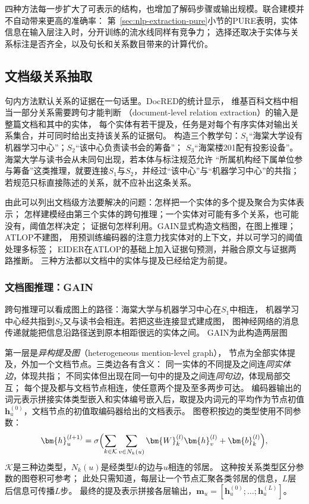 四种方法每一步扩大了可表示的结构，也增加了解码步骤或输出规模。联合建模并不自动带来更高的准确率：
第~\ref{sec:nlp-extraction-pure}小节的PURE表明，实体信息在输入层注入时，分开训练的流水线同样有竞争力；
选择还取决于实体与关系标注是否齐全，以及句长和关系数目带来的计算代价。

\subsection{文档级关系抽取}
\label{sec:nlp-extraction-docre}

句内方法默认关系的证据在一句话里。DocRED的统计显示，
维基百科文档中相当一部分关系需要跨句才能判断
（document-level relation extraction）的输入是整篇文档和其中的实体，
每个实体有若干提及，任务是对每个有序实体对输出关系集合，并可同时给出支持该关系的证据句。
构造三个教学句：$S_1$“海棠大学设有机器学习中心”；$S_2$“该中心负责读书会的筹备”；
$S_3$“海棠楼201配有投影设备”。海棠大学与读书会从未同句出现，若本体与标注规范允许
“所属机构经下属单位参与筹备”这类推理，就要连接$S_1$与$S_2$，并经过“该中心”与“机器学习中心”的共指；
若规范只标直接陈述的关系，就不应补出这条关系。

由此可以列出文档级方法要解决的问题：怎样把一个实体的多个提及聚合为实体表示；
怎样建模经由第三个实体的跨句推理；一个实体对可能有多个关系，也可能没有，阈值怎样决定；
证据句怎样利用。GAIN显式构造文档图，在图上推理；ATLOP不建图，
用预训练编码器的注意力找实体对的上下文，并以可学习的阈值处理多标签；
EIDER在ATLOP的基础上加入证据句预测，并融合原文与证据两路推断。
三种方法都以文档中的实体与提及已经给定为前提。

\subsubsection{文档图推理：GAIN}
\label{sec:nlp-extraction-gain}

跨句推理可以看成图上的路径：海棠大学与机器学习中心在$S_1$中相连，
机器学习中心经共指到$S_2$又与读书会相连。若把这些连接显式建成图，
图神经网络的消息传递就能把信息沿路径送到原本相距很远的实体之间。
GAIN为此构造两层图

第一层是\emph{异构提及图}（heterogeneous mention-level graph），
节点为全部实体提及，外加一个文档节点。三类边各有含义：
同一实体的不同提及之间连\emph{同实体边}，体现共指；
不同实体但出现在同一句中的提及之间连\emph{同句边}，体现局部交互；
每个提及都与文档节点相连，使任意两个提及至多两步可达。
编码器输出的词元表示拼接实体类型嵌入和实体编号嵌入后，取提及内词元的平均作为节点初值$\bm{h}^{(0)}_u$，文档节点的初值取编码器给出的文档表示。
图卷积按边的类型使用不同参数：
\begin{equation}
  \bm{h}^{(l+1)}_u=\sigma\Bigl(\sum_{k\in\mathcal{K}}\sum_{v\in N_k(u)}
    \bm{W}^{(l)}_k\bm{h}^{(l)}_v+\bm{b}^{(l)}_k\Bigr),
  \label{eq:nlp-extraction-gain-gcn}
\end{equation}
$\mathcal{K}$是三种边类型，$N_k(u)$是经类型$k$的边与$u$相连的邻居。
这种按关系类型区分参数的图卷积可参考；
此处只需知道，每层让一个节点汇聚各类邻居的信息，$L$层后信息可传播$L$步。
最终的提及表示拼接各层输出，$\bm{m}_u=[\bm{h}^{(0)}_u;\ldots;\bm{h}^{(L)}_u]$。


